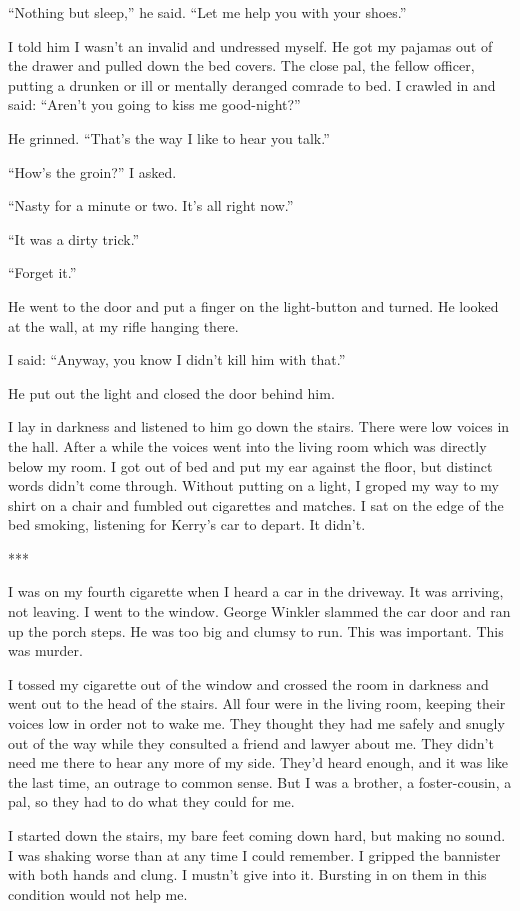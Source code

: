 \documentclass{novel}
\begin{document}
{“Nothing but sleep,” he said. “Let me help you with your shoes.”

I told him I wasn’t an invalid and undressed myself. He got my pajamas out of the drawer and pulled down the bed covers. The close pal, the fellow officer, putting a drunken or ill or mentally deranged comrade to bed. I crawled in and said: “Aren’t you going to kiss me good-night?”

He grinned. “That’s the way I like to hear you talk.”

“How’s the groin?” I asked.

“Nasty for a minute or two. It’s all right now.”

“It was a dirty trick.”

“Forget it.”

He went to the door and put a finger on the light-button and turned. He looked at the wall, at my rifle hanging there.

I said: “Anyway, you know I didn’t kill him with that.”

He put out the light and closed the door behind him.

I lay in darkness and listened to him go down the stairs. There were low voices in the hall. After a while the voices went into the living room which was directly below my room. I got out of bed and put my ear against the floor, but distinct words didn’t come through. Without putting on a light, I groped my way to my shirt on a chair and fumbled out cigarettes and matches. I sat on the edge of the bed smoking, listening for Kerry’s car to depart. It didn’t.

***

I was on my fourth cigarette when I heard a car in the driveway. It was arriving, not leaving. I went to the window. George Winkler slammed the car door and ran up the porch steps. He was too big and clumsy to run. This was important. This was murder.

I tossed my cigarette out of the window and crossed the room in darkness and went out to the head of the stairs. All four were in the living room, keeping their voices low in order not to wake me. They thought they had me safely and snugly out of the way while they consulted a friend and lawyer about me. They didn’t need me there to hear any more of my side. They’d heard enough, and it was like the last time, an outrage to common sense. But I was a brother, a foster-cousin, a pal, so they had to do what they could for me.

I started down the stairs, my bare feet coming down hard, but making no sound. I was shaking worse than at any time I could remember. I gripped the bannister with both hands and clung. I mustn’t give into it. Bursting in on them in this condition would not help me.

}
\end{document}
